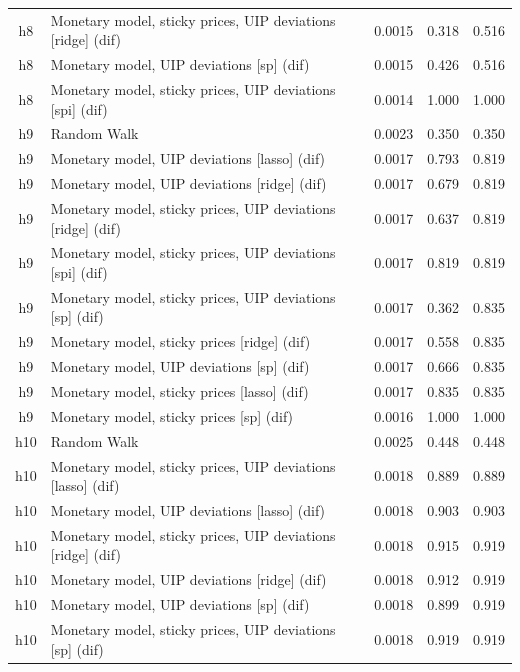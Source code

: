 \begin{ThreePartTable}
\begin{longtable}[t]{cp{5.5cm}ccc}
h8 & \raggedright Monetary model, sticky prices, UIP deviations [ridge] (dif) & 0.0015 & 0.318 & 0.516\\
h8 & \raggedright Monetary model, UIP deviations [sp] (dif) & 0.0015 & 0.426 & 0.516\\
h8 & \raggedright Monetary model, sticky prices, UIP deviations [spi] (dif) & 0.0014 & 1.000 & 1.000\\
\addlinespace
h9 & \raggedright Random Walk & 0.0023 & 0.350 & 0.350\\
h9 & \raggedright Monetary model, UIP deviations [lasso] (dif) & 0.0017 & 0.793 & 0.819\\
h9 & \raggedright Monetary model, UIP deviations [ridge] (dif) & 0.0017 & 0.679 & 0.819\\
h9 & \raggedright Monetary model, sticky prices, UIP deviations [ridge] (dif) & 0.0017 & 0.637 & 0.819\\
h9 & \raggedright Monetary model, sticky prices, UIP deviations [spi] (dif) & 0.0017 & 0.819 & 0.819\\
h9 & \raggedright Monetary model, sticky prices, UIP deviations [sp] (dif) & 0.0017 & 0.362 & 0.835\\
h9 & \raggedright Monetary model, sticky prices [ridge] (dif) & 0.0017 & 0.558 & 0.835\\
h9 & \raggedright Monetary model, UIP deviations [sp] (dif) & 0.0017 & 0.666 & 0.835\\
h9 & \raggedright Monetary model, sticky prices [lasso] (dif) & 0.0017 & 0.835 & 0.835\\
h9 & \raggedright Monetary model, sticky prices [sp] (dif) & 0.0016 & 1.000 & 1.000\\
\addlinespace
h10 & \raggedright Random Walk & 0.0025 & 0.448 & 0.448\\
h10 & \raggedright Monetary model, sticky prices, UIP deviations [lasso] (dif) & 0.0018 & 0.889 & 0.889\\
h10 & \raggedright Monetary model, UIP deviations [lasso] (dif) & 0.0018 & 0.903 & 0.903\\
h10 & \raggedright Monetary model, sticky prices, UIP deviations [ridge] (dif) & 0.0018 & 0.915 & 0.919\\
h10 & \raggedright Monetary model, UIP deviations [ridge] (dif) & 0.0018 & 0.912 & 0.919\\
h10 & \raggedright Monetary model, UIP deviations [sp] (dif) & 0.0018 & 0.899 & 0.919\\
h10 & \raggedright Monetary model, sticky prices, UIP deviations [sp] (dif) & 0.0018 & 0.919 & 0.919\\

\end{longtable}
\end{ThreePartTable}
